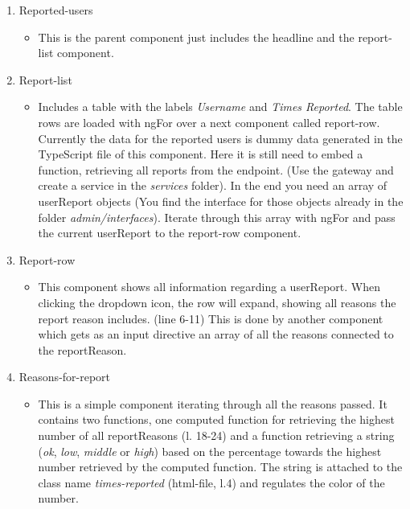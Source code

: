 \begin{enumerate}
    \item Reported-users
    \begin{itemize}
        \item This is the parent component just includes the headline and the report-list component.
    \end{itemize}
    \item Report-list
    \begin{itemize}
        \item Includes a table with the labels \textit{Username} and \textit{Times Reported}.
            The table rows are loaded with ngFor over a next component called report-row.
            Currently the data for the reported users is dummy data generated in the TypeScript file of this component.
            Here it is still need to embed a function, retrieving all reports from the endpoint.
            (Use the gateway and create a service in the \textit{services} folder).
            In the end you need an array of userReport objects (You find the interface for those objects already in the
            folder \textit{admin/interfaces}).
            Iterate through this array with ngFor and pass the current userReport to the report-row component.
    \end{itemize}
    \item Report-row
    \begin{itemize}
        \item This component shows all information regarding a userReport.
            When clicking the dropdown icon, the row will expand, showing all reasons the report reason includes.
            (line 6-11) This is done by another component which gets as an input directive an array of all the reasons
            connected to the reportReason.
    \end{itemize}
    \item Reasons-for-report
    \begin{itemize}
        \item This is a simple component iterating through all the reasons passed.
        It contains two functions, one computed function for retrieving the highest number of all reportReasons
        (l. 18-24) and a function retrieving a string (\textit{ok}, \textit{low}, \textit{middle} or \textit{high})
        based on the percentage towards the highest number retrieved by the computed function.
        The string is attached to the class name \textit{times-reported} (html-file, l.4) and regulates the color of
        the number.
    \end{itemize}
\end{enumerate}

